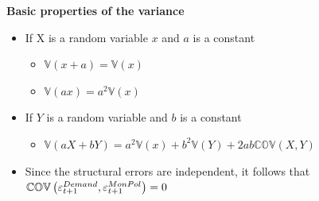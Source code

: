 \documentclass[10pt,english,t,aspectratio=169,ignorenonframetext]{beamer}
\begin{document}
\begin{frame}
{\textbf{Basic properties of the variance \ {} }}\bigskip \bigskip 

\begin{itemize}
\item If X is a random variable $x$ and $a$ is a constant

\begin{itemize}
\item $\mathbb{V}\left( x+a\right) =\mathbb{V}\left( x\right) $

\item $\mathbb{V}\left( ax\right) =a^{2}\mathbb{V}\left( x\right) $\bigskip
\medskip
\end{itemize}

\item If $Y$ is a random variable and $b$ is a constant

\begin{itemize}
\item $\mathbb{V}\left( aX+bY\right) =a^{2}\mathbb{V}\left( x\right) +b^{2}%
\mathbb{V}\left( Y\right) +2ab\mathbb{COV}\left( X,Y\right) $\bigskip
\medskip\ 
\end{itemize}

\item Since the structural errors are independent, it follows that $\mathbb{%
COV}\left( \varepsilon _{t+1}^{Demand},\varepsilon _{t+1}^{MonPol}\right) =0$
\end{itemize}
\end{frame}

\end{document}
